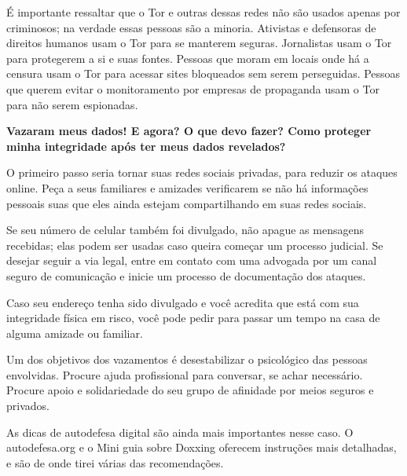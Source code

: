 É importante ressaltar que o Tor e outras dessas redes não são usados
apenas por criminosos; na verdade essas pessoas são a minoria. Ativistas
e defensoras de direitos humanos usam o Tor para se manterem seguras.
Jornalistas usam o Tor para protegerem a si e suas fontes. Pessoas que
moram em locais onde há a censura usam o Tor para acessar sites
bloqueados sem serem perseguidas. Pessoas que querem evitar o
monitoramento por empresas de propaganda usam o Tor para não serem
espionadas.

\bigskip

\noindent{}\textbf{Vazaram meus dados! E agora? O que devo fazer? Como proteger
minha integridade após ter meus dados revelados?}

O primeiro passo seria tornar suas redes sociais
privadas, para reduzir os ataques online. Peça a seus familiares e
amizades verificarem se não há informações pessoais suas que eles ainda
estejam compartilhando em suas redes sociais.

Se seu número de celular também foi divulgado, não apague as mensagens
recebidas; elas podem ser usadas caso queira começar um processo
judicial. Se desejar seguir a via legal, entre em contato com uma
advogada por um canal seguro de comunicação e inicie um processo de
documentação dos ataques.

Caso seu endereço tenha sido divulgado e você acredita que está com sua
integridade física em risco, você pode pedir para passar um tempo na
casa de alguma amizade ou familiar.

Um dos objetivos dos vazamentos é desestabilizar o psicológico das
pessoas envolvidas. Procure ajuda profissional para conversar, se achar
necessário. Procure apoio e solidariedade do seu grupo de afinidade por
meios seguros e privados.

As dicas de autodefesa digital são ainda mais importantes nesse caso. O
autodefesa.org e o Mini guia sobre Doxxing oferecem instruções mais
detalhadas, e são de onde tirei várias das recomendações.

%
%
%
%
%
%
%
%
%
%
%
%
%
%


